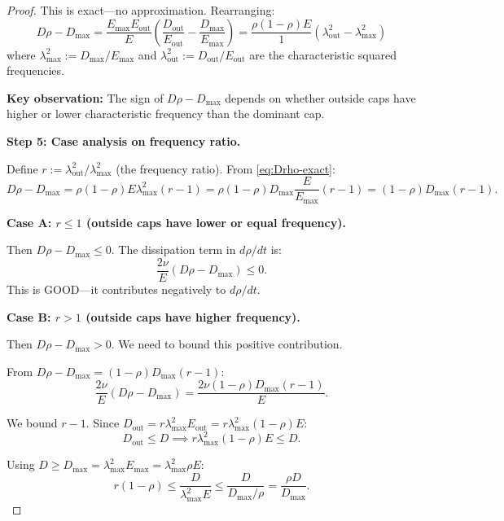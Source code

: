 \documentclass[11pt]{article}
\theoremstyle{definition}
\begin{document}
\begin{proof}
This is exact---no approximation. Rearranging:
\begin{equation}\label{eq:Drho-exact}
D\rho - D_{\max} = \frac{E_{\max} E_{\text{out}}}{E} \left( \frac{D_{\text{out}}}{E_{\text{out}}} - \frac{D_{\max}}{E_{\max}} \right) = \frac{\rho(1-\rho) E}{1} \left( \lambda_{\text{out}}^2 - \lambda_{\max}^2 \right)
\end{equation}
where $\lambda_{\max}^2 := D_{\max}/E_{\max}$ and $\lambda_{\text{out}}^2 := D_{\text{out}}/E_{\text{out}}$ are the characteristic squared frequencies.

\textbf{Key observation:} The sign of $D\rho - D_{\max}$ depends on whether outside caps have higher or lower characteristic frequency than the dominant cap.

\textbf{Step 5: Case analysis on frequency ratio.}

Define $r := \lambda_{\text{out}}^2 / \lambda_{\max}^2$ (the frequency ratio). From \eqref{eq:Drho-exact}:
\begin{equation}
D\rho - D_{\max} = \rho(1-\rho) E \lambda_{\max}^2 (r - 1) = \rho(1-\rho) D_{\max} \frac{E}{E_{\max}} (r-1) = (1-\rho) D_{\max} (r-1).
\end{equation}

\textbf{Case A: $r \leq 1$ (outside caps have lower or equal frequency).}

Then $D\rho - D_{\max} \leq 0$. The dissipation term in $d\rho/dt$ is:
\begin{equation}
\frac{2\nu}{E}(D\rho - D_{\max}) \leq 0.
\end{equation}
This is GOOD---it contributes negatively to $d\rho/dt$.

\textbf{Case B: $r > 1$ (outside caps have higher frequency).}

Then $D\rho - D_{\max} > 0$. We need to bound this positive contribution.

From $D\rho - D_{\max} = (1-\rho) D_{\max} (r-1)$:
\begin{equation}
\frac{2\nu}{E}(D\rho - D_{\max}) = \frac{2\nu (1-\rho) D_{\max} (r-1)}{E}.
\end{equation}

We bound $r-1$. Since $D_{\text{out}} = r \lambda_{\max}^2 E_{\text{out}} = r \lambda_{\max}^2 (1-\rho) E$:
\begin{equation}
D_{\text{out}} \leq D \implies r \lambda_{\max}^2 (1-\rho) E \leq D.
\end{equation}

Using $D \geq D_{\max} = \lambda_{\max}^2 E_{\max} = \lambda_{\max}^2 \rho E$:
\begin{equation}
r(1-\rho) \leq \frac{D}{\lambda_{\max}^2 E} \leq \frac{D}{D_{\max}/\rho} = \frac{\rho D}{D_{\max}}.
\end{equation}


\end{proof}
\end{document}

